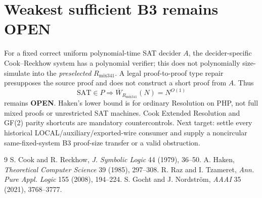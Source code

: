 \documentclass[11pt]{article}
\begin{document}
\section*{Weakest sufficient B3 remains OPEN}
For a fixed correct uniform polynomial-time SAT decider $A$, the decider-specific Cook--Reckhow system has a polynomial verifier; this does not polynomially size-simulate into the \emph{preselected} $R_{\mathrm{mix341}}$. A legal proof-to-proof type repair presupposes the source proof and does not construct a short proof from $A$. Thus
\[
\mathrm{SAT}\in P\Longrightarrow \overline W_{R_{\mathrm{mix341}}}(N)=N^{O(1)}
\]
remains \textbf{OPEN}. Haken's lower bound is for ordinary Resolution on PHP, not full mixed proofs or unrestricted SAT machines. Cook Extended Resolution and GF(2) parity shortcuts are mandatory countercontrols. Next target: settle every historical LOCAL/auxiliary/exported-wire consumer and supply a noncircular same-fixed-system B3 proof-size transfer or a valid obstruction.

\begin{thebibliography}{9}
 S. Cook and R. Reckhow, \emph{J. Symbolic Logic} 44 (1979), 36--50.
 A. Haken, \emph{Theoretical Computer Science} 39 (1985), 297--308.
 R. Raz and I. Tzameret, \emph{Ann. Pure Appl. Logic} 155 (2008), 194--224.
 S. Gocht and J. Nordstr\"om, \emph{AAAI} 35 (2021), 3768--3777.
\end{thebibliography}
\end{document}
